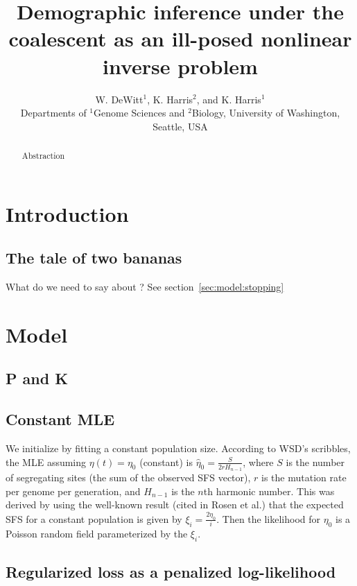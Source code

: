 \documentclass[11pt]{article}
\title{Demographic inference under the coalescent as an ill-posed nonlinear inverse problem}
\author{
W. DeWitt$^{1}$, K. Harris$^{2}$, and K. Harris$^{1}$\\
\small{Departments of $^1$Genome Sciences and $^2$Biology, University of Washington, Seattle, USA}
}
\begin{document}
\maketitle

\begin{abstract}
Abstraction
\end{abstract}

\section*{Introduction}\label{sec:intro}


\subsection*{The tale of two bananas}\label{sec:intro:bananas}

What do we need to say about \cite{Rosen2018-bb}? See section~\ref{sec:model:stopping}


\section*{Model}\label{sec:model}

\subsection*{P and K}\label{sec:model:PandK}

\cite{Polanski2003-ll}


\subsection*{Constant MLE}\label{sec:model:constant}

We initialize by fitting a constant population size.
According to WSD's scribbles, the MLE assuming $\eta(t) = \eta_0$ (constant) is $\hat \eta_0 = \frac{S}{2 r H_{n-1}}$, where $S$ is the number of segregating sites (the sum of the observed SFS vector), $r$ is the mutation rate per genome per generation, and $H_{n-1}$ is the $n$th harmonic number.
This was derived by using the well-known result (cited in Rosen et al.) that the expected SFS for a constant population is given by $\xi_i = \frac{2\eta_0}{i}$.
Then the likelihood for $\eta_0$ is a Poisson random field parameterized by the $\xi_i$.


\subsection*{Regularized loss as a penalized log-likelihood}\label{sec:model:penalization}
\end{document}
